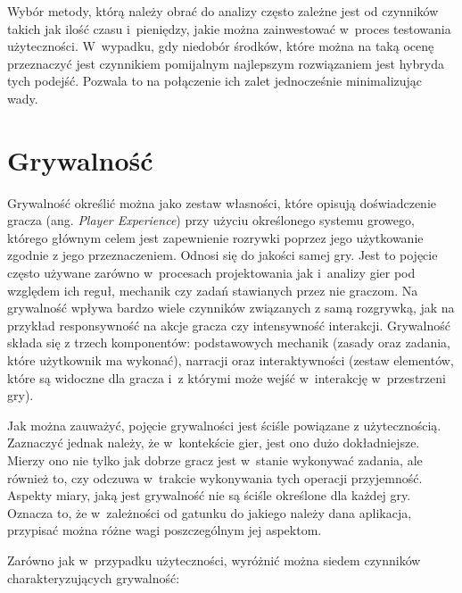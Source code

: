 \documentclass[a4paper,12pt,numbers=noenddot]{report}
\begin{document}
Wybór metody, którą należy obrać do analizy często zależne jest od czynników takich jak ilość czasu i~pieniędzy, jakie można zainwestować w~proces testowania użyteczności. W~wypadku, gdy niedobór środków, które można na taką ocenę przeznaczyć jest czynnikiem pomijalnym najlepszym rozwiązaniem jest hybryda tych podejść. Pozwala to na połączenie ich zalet jednocześnie minimalizując wady.

\section{Grywalność}
Grywalność określić można jako zestaw własności, które opisują doświadczenie gracza (ang. \textit{Player Experience}) przy użyciu określonego systemu growego, którego głównym celem jest zapewnienie rozrywki poprzez jego użytkowanie zgodnie z jego przeznaczeniem. \cite{art_Playability} Odnosi się do jakości samej gry. Jest to pojęcie często używane zarówno w~procesach projektowania jak i~analizy gier pod względem ich reguł, mechanik czy zadań stawianych przez nie graczom. Na grywalność wpływa bardzo wiele czynników związanych z samą rozgrywką, jak na przykład responsywność na akcje gracza czy intensywność interakcji.
Grywalność składa się z trzech komponentów: podstawowych mechanik (zasady oraz zadania, które użytkownik ma wykonać), narracji oraz interaktywności (zestaw elementów, które są widoczne dla gracza i~z którymi może wejść w~interakcję w~przestrzeni gry). \cite{art_UserExperience}

Jak można zauważyć, pojęcie grywalności jest ściśle powiązane z użytecznością. Zaznaczyć jednak należy, że w~kontekście gier, jest ono dużo dokładniejsze. Mierzy ono nie tylko jak dobrze gracz jest w~stanie wykonywać zadania, ale również to, czy odczuwa w~trakcie wykonywania tych operacji przyjemność. Aspekty miary, jaką jest grywalność nie są ściśle określone dla każdej gry. Oznacza to, że w~zależności od gatunku do jakiego należy dana aplikacja, przypisać można różne wagi poszczególnym jej aspektom.

Zarówno jak w~przypadku użyteczności, wyróżnić można siedem czynników charakteryzujących grywalność:
\end{document}
